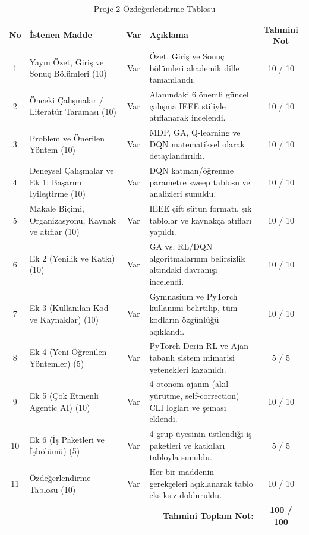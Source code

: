 \documentclass[conference]{IEEEtran}
\begin{document}
\begin{table}[htbp]
\caption{Proje 2 Özdeğerlendirme Tablosu}
\label{tab:self_eval}
\begin{center}
\begin{tabular}{|c|l|c|l|c|}
\hline
\textbf{No} & \textbf{İstenen Madde} & \textbf{Var} & \textbf{Açıklama} & \textbf{Tahmini Not} \\
\hline
1 & Yayın Özet, Giriş ve Sonuç Bölümleri (10) & Var & Özet, Giriş ve Sonuç bölümleri akademik dille tamamlandı. & 10 / 10 \\
\hline
2 & Önceki Çalışmalar / Literatür Taraması (10) & Var & Alanındaki 6 önemli güncel çalışma IEEE stiliyle atıflanarak incelendi. & 10 / 10 \\
\hline
3 & Problem ve Önerilen Yöntem (10) & Var & MDP, GA, Q-learning ve DQN matematiksel olarak detaylandırıldı. & 10 / 10 \\
\hline
4 & Deneysel Çalışmalar ve Ek 1: Başarım İyileştirme (10) & Var & DQN katman/öğrenme parametre sweep tablosu ve analizleri sunuldu. & 10 / 10 \\
\hline
5 & Makale Biçimi, Organizasyonu, Kaynak ve atıflar (10) & Var & IEEE çift sütun formatı, şık tablolar ve kaynakça atıfları yapıldı. & 10 / 10 \\
\hline
6 & Ek 2 (Yenilik ve Katkı) (10) & Var & GA vs. RL/DQN algoritmalarının belirsizlik altındaki davranışı incelendi. & 10 / 10 \\
\hline
7 & Ek 3 (Kullanılan Kod ve Kaynaklar) (10) & Var & Gymnasium ve PyTorch kullanımı belirtilip, tüm kodların özgünlüğü açıklandı. & 10 / 10 \\
\hline
8 & Ek 4 (Yeni Öğrenilen Yöntemler) (5) & Var & PyTorch Derin RL ve Ajan tabanlı sistem mimarisi yetenekleri kazanıldı. & 5 / 5 \\
\hline
9 & Ek 5 (Çok Etmenli Agentic AI) (10) & Var & 4 otonom ajanın (akıl yürütme, self-correction) CLI logları ve şeması eklendi. & 10 / 10 \\
\hline
10 & Ek 6 (İş Paketleri ve İşbölümü) (5) & Var & 4 grup üyesinin üstlendiği iş paketleri ve katkıları tabloyla sunuldu. & 5 / 5 \\
\hline
11 & Özdeğerlendirme Tablosu (10) & Var & Her bir maddenin gerekçeleri açıklanarak tablo eksiksiz dolduruldu. & 10 / 10 \\
\hline
\multicolumn{4}{|r|}{\textbf{Tahmini Toplam Not:}} & \textbf{100 / 100} \\
\hline
\end{tabular}
\end{center}
\end{table}
\end{document}
